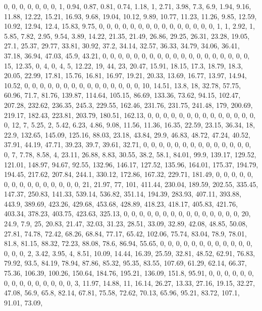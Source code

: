 \documentclass[
]{article}
\begin{document}
0, 0, 0, 0, 0, 0, 0, 1, 0.94, 0.87, 0.81, 0.74, 1.18, 1, 2.71, 3.98,
7.3, 6.9, 1.94, 9.16, 11.88, 12.22, 15.21, 16.93, 9.68, 19.04, 10.12,
9.89, 10.77, 11.23, 11.26, 9.85, 12.59, 10.92, 12.94, 12.4, 15.83, 9.75,
0, 0, 0, 0, 0, 0, 0, 0, 0, 0, 0, 0, 0, 0, 0, 1, 1, 2.92, 1, 5.85, 7.82,
2.95, 9.54, 3.89, 14.22, 21.35, 21.49, 26.86, 29.25, 26.31, 23.28,
19.05, 27.1, 25.37, 29.77, 33.81, 30.92, 37.2, 34.14, 32.57, 36.33,
34.79, 34.06, 36.41, 37.18, 36.94, 47.03, 45.9, 43.21, 0, 0, 0, 0, 0, 0,
0, 0, 0, 0, 0, 0, 0, 0, 0, 0, 0, 0, 0, 15, 12.35, 0, 4, 0, 4, 5, 12.22,
19, 44, 23, 20.47, 15.91, 18.15, 17.3, 18.79, 18.3, 20.05, 22.99, 17.81,
15.76, 16.81, 16.97, 19.21, 20.33, 13.69, 16.77, 13.97, 14.94, 10.52, 0,
0, 0, 0, 0, 0, 0, 0, 0, 0, 0, 0, 0, 0, 0, 10, 14.51, 13.8, 18, 32.78,
57.75, 60.96, 71.7, 81.76, 139.87, 114.64, 105.15, 86.69, 133.36, 73.62,
94.15, 102.47, 207.28, 232.62, 236.35, 245.3, 229.55, 162.46, 231.76,
231.75, 241.48, 179, 200.69, 219.17, 182.43, 223.81, 203.79, 180.51,
162.13, 0, 0, 0, 0, 0, 0, 0, 0, 0, 0, 0, 0, 0, 0, 0, 12, 7, 5.25, 2,
5.42, 6.23, 4.86, 9.08, 11.56, 11.36, 16.35, 22.59, 23.15, 36.34, 18,
22.9, 132.65, 145.09, 125.16, 88.03, 23.18, 43.84, 29.9, 46.83, 48.72,
47.24, 40.52, 37.91, 44.19, 47.71, 39.23, 39.7, 39.61, 32.71, 0, 0, 0,
0, 0, 0, 0, 0, 0, 0, 0, 0, 0, 0, 0, 7, 7.78, 8.58, 4, 23.11, 26.88,
8.83, 30.55, 38.2, 58.1, 84.01, 99.9, 139.17, 129.52, 121.01, 148.97,
94.67, 92.55, 132.96, 146.17, 127.52, 135.96, 164.01, 175.37, 194.79,
194.45, 217.62, 207.84, 244.1, 330.12, 172.86, 167.32, 229.71, 181.49,
0, 0, 0, 0, 0, 0, 0, 0, 0, 0, 0, 0, 0, 0, 0, 21, 21.97, 77, 101, 411.44,
230.04, 189.59, 202.55, 335.45, 147.37, 250.83, 141.33, 539.14, 536.82,
351.14, 194.39, 283.93, 407.11, 393.88, 443.9, 389.69, 423.26, 429.68,
453.68, 428.89, 418.23, 418.17, 405.83, 421.76, 403.34, 378.23, 403.75,
423.63, 325.13, 0, 0, 0, 0, 0, 0, 0, 0, 0, 0, 0, 0, 0, 0, 0, 20, 24.9,
7.9, 25, 20.83, 21.47, 32.03, 31.23, 28.51, 33.09, 32.89, 42.08, 48.85,
50.08, 27.81, 74.78, 72.42, 68.26, 68.84, 77.17, 65.42, 102.06, 75.74,
83.04, 78.9, 78.01, 81.8, 81.15, 88.32, 72.23, 88.08, 78.6, 86.94,
55.65, 0, 0, 0, 0, 0, 0, 0, 0, 0, 0, 0, 0, 0, 0, 0, 2, 3.42, 3.95, 4,
8.51, 10.09, 14.44, 16.39, 25.59, 32.81, 48.52, 62.91, 76.83, 79.92,
93.5, 84.19, 78.94, 87.86, 85.32, 95.35, 83.55, 107.69, 61.29, 62.14,
66.37, 75.36, 106.39, 100.26, 150.64, 184.76, 195.21, 136.09, 151.8,
95.91, 0, 0, 0, 0, 0, 0, 0, 0, 0, 0, 0, 0, 0, 0, 0, 3, 11.97, 14.88, 11,
16.14, 26.27, 13.33, 27.16, 19.15, 32.27, 47.08, 56.9, 65.8, 82.14,
67.81, 75.58, 72.62, 70.13, 65.96, 95.21, 83.72, 107.1, 91.01, 73.09,
\end{document}
